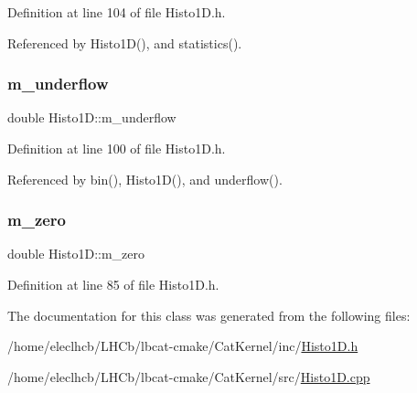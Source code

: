 Definition at line 104 of file Histo1\+D.\+h.



Referenced by Histo1\+D(), and statistics().

\mbox{\label{classHisto1D_a7f475b822f4bbb23209e2e523d228380}} 
\subsubsection{\texorpdfstring{m\+\_\+underflow}{m\_underflow}}
{\footnotesize\ttfamily double Histo1\+D\+::m\+\_\+underflow\hspace{0.3cm}{\ttfamily [private]}}



Definition at line 100 of file Histo1\+D.\+h.



Referenced by bin(), Histo1\+D(), and underflow().

\mbox{\label{classHisto1D_ac87bd1971cc300ce6fc1e745785cacb9}} 
\subsubsection{\texorpdfstring{m\+\_\+zero}{m\_zero}}
{\footnotesize\ttfamily double Histo1\+D\+::m\+\_\+zero\hspace{0.3cm}{\ttfamily [private]}}



Definition at line 85 of file Histo1\+D.\+h.



The documentation for this class was generated from the following files\+:\begin{DoxyCompactItemize}
\item 
/home/eleclhcb/\+L\+H\+Cb/lbcat-\/cmake/\+Cat\+Kernel/inc/\hyperlink{Histo1D_8h}{Histo1\+D.\+h}\item 
/home/eleclhcb/\+L\+H\+Cb/lbcat-\/cmake/\+Cat\+Kernel/src/\hyperlink{Histo1D_8cpp}{Histo1\+D.\+cpp}\end{DoxyCompactItemize}
